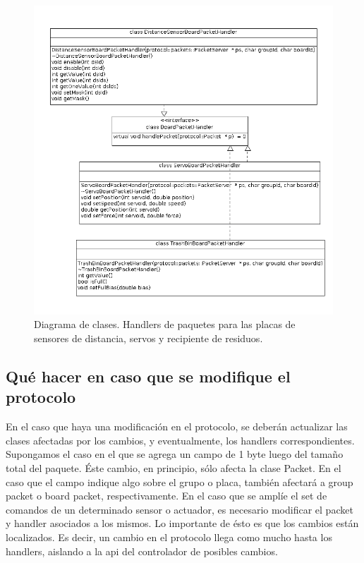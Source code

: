 \begin{figure}[ht]
	\centering
	\includegraphics[scale=0.52]{comportamientos/figures/cs6.png}
	\caption[Diagrama de clases: Handlers 2]{Diagrama de clases. Handlers de paquetes para las placas de sensores de 
	distancia, servos y recipiente de residuos.}
	\label{fig:handler_specific_2}
\end{figure}


\subsection{Qu\'e hacer en caso que se modifique el protocolo}
En el caso que haya una modificaci\'on en el protocolo, se deber\'an
actualizar las clases afectadas por los cambios, y eventualmente,
los handlers correspondientes.
\\\indent
Supongamos el caso en el que se agrega un campo de 1 byte luego del tama\~no
total del paquete. \'Este cambio, en principio, s\'olo afecta la clase
Packet. En el caso que el campo indique algo sobre el grupo o placa,
tambi\'en afectar\'a a group packet o board packet, respectivamente.
En el caso que se ampl\'ie el set de comandos de un determinado sensor o
actuador, es necesario modificar el packet y handler asociados a los
mismos. Lo importante de \'esto es que los cambios est\'an localizados.
Es decir, un cambio en el protocolo llega como mucho hasta los handlers,
aislando a la api del controlador de posibles cambios.






